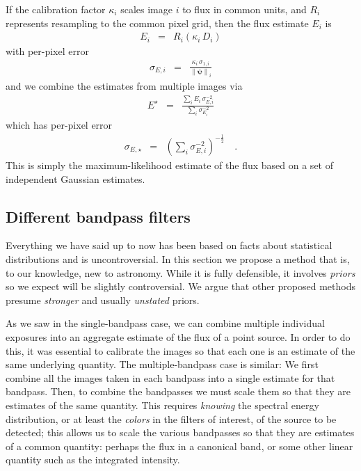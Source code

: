 \documentclass[letterpaper,preprint]{aastex}
\newcommand{\psf}{\psi}
\newcommand{\psfnorm}{\norm{\bm{\psf}}}
\newcommand{\norm}[1]{\left\lVert #1 \right\rVert}
\begin{document}


If the calibration factor $\kappa_i$ scales image $i$ to flux in
common units, and $R_i$ represents resampling to the common pixel grid,
then the flux estimate $E_i$ is
\begin{eqnarray}
E_i &=& R_i(\kappa_i \, D_i)
\end{eqnarray}
with per-pixel error
\begin{eqnarray}
\sigma_{E, i} &=& \frac{\kappa_i \, \sigma_{1,i}}{\psfnorm_i}
\end{eqnarray}
and we combine the estimates from multiple images via
\begin{eqnarray}
E^{\star} &=& \frac{\displaystyle\sum_i E_i \, \sigma^{-2}_{E,i}}{\displaystyle\sum_i \sigma^{-2}_{E_i}}
\label{eq:onebandmap}
\end{eqnarray}
which has per-pixel error
\begin{eqnarray}
\sigma_{E, \star} &=& \left( \sum_i \sigma^{-2}_{E,i} \right)^{-\frac{1}{2}}    \quad .
\end{eqnarray}
This is simply the maximum-likelihood estimate of the flux based on a
set of independent Gaussian estimates.



\subsection{Different bandpass filters}

Everything we have said up to now has been based on facts about
statistical distributions and is uncontroversial.  In this section we
propose a method that is, to our knowledge, new to astronomy.  While
it is fully defensible, it involves \emph{priors} so we expect will be
slightly controversial.  We argue that other proposed methods presume
\emph{stronger} and usually \emph{unstated} priors.


As we saw in the single-bandpass case, we can combine multiple
individual exposures into an aggregate estimate of the flux of a point
source.  In order to do this, it was essential to calibrate the images
so that each one is an estimate of the same underlying quantity.  The
multiple-bandpass case is similar: We first combine all the images
taken in each bandpass into a single estimate for that bandpass.
Then, to combine the bandpasses we must scale them so that they are
estimates of the same quantity.  This requires \emph{knowing} the
spectral energy distribution, or at least the \emph{colors} in the
filters of interest, of the source to be detected; this allows us to
scale the various bandpasses so that they are estimates of a common
quantity: perhaps the flux in a canonical band, or some other linear
quantity such as the integrated intensity.
\end{document}
